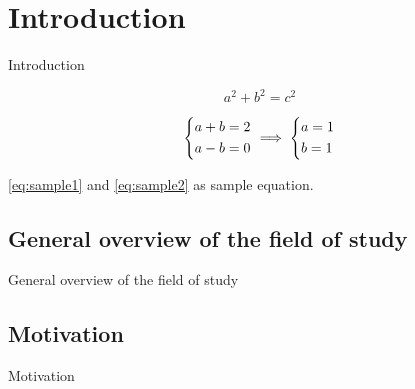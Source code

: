\chapter{Introduction}
Introduction

\begin{equation}\label{eq:sample1}
	a^2 + b^2 = c^2
\end{equation}

\begin{equation}\label{eq:sample2}
\begin{dcases}
	a + b = 2\\
	a - b = 0
\end{dcases}
\implies
\begin{dcases}
a = 1\\
b = 1
\end{dcases}
\end{equation}

\autoref{eq:sample1} and \ref{eq:sample2} as sample equation.

\section{General overview of the field of study}

General overview of the field of study

\section{Motivation}
Motivation